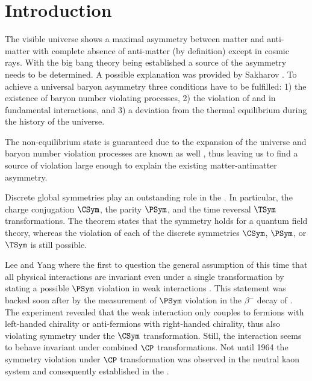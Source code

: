 
\chapter{Introduction}
\label{ch:introduction}

The visible universe shows a maximal asymmetry between matter and anti-matter
with complete absence of anti-matter (by definition) except in cosmic rays. With
the big bang theory being established a source of the asymmetry needs to be
determined. A possible explanation was provided by Sakharov
\cite{Sakharov:1967dj}. To achieve a universal baryon asymmetry three conditions
have to be fulfilled: 1) the existence of baryon number violating processes, 2)
the violation of \CSym and \CP in fundamental interactions, and 3) a deviation
from the thermal equilibrium during the history of the universe.

The non-equilibrium state is guaranteed due to the expansion of the universe and
baryon number violation processes are known as well
\cite{tHooft:1976up,Rubakov:1996vz}, thus leaving us to find a source of \CP
violation large enough to explain the existing matter-antimatter asymmetry.

Discrete global symmetries play an outstanding role in the \SM. In particular,
the charge conjugation $\CSym$, the parity $\PSym$, and the time reversal
$\TSym$ transformations. The \CPT theorem \cite{set:cpt} states that the \CPT
symmetry holds for a quantum field theory, whereas the violation of each of
the discrete symmetries $\CSym$, $\PSym$, or $\TSym$ is still possible.

Lee and Yang where the first to question the general assumption of this time that all
physical interactions are invariant even under a single transformation by
stating a possible $\PSym$ violation in weak interactions \cite{Lee:1956qn}. This
statement was backed soon after by the measurement of $\PSym$ violation in the
$\beta^{-}$ decay of \cobaltsixty \cite{Wu:1957my}. The experiment
revealed that the weak interaction only couples to fermions with left-handed
chirality or anti-fermions with right-handed chirality, thus also violating
symmetry under the $\CSym$ transformation. Still, the interaction seems to behave
invariant under combined $\CP$ transformations. Not until 1964 the symmetry
violation under $\CP$ transformation was observed in the neutral kaon system
\cite{Christenson:1964fg} and consequently established in the \SM.

